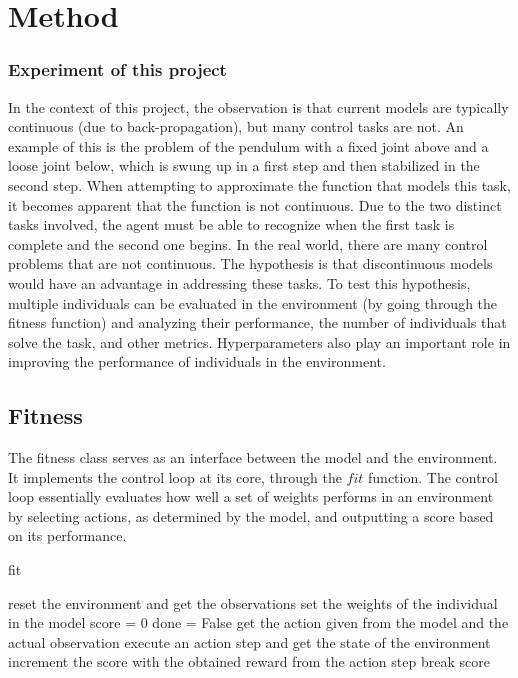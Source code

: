 \chapter{Method}
\label{ch:method}

\subsection{Experiment of this project}
In the context of this project, the observation is that current models are typically continuous (due to back-propagation), but many control tasks are not. An example of this is the problem of the pendulum with a fixed joint above and a loose joint below, which is swung up in a first step and then stabilized in the second step. When attempting to approximate the function that models this task, it becomes apparent that the function is not continuous. Due to the two distinct tasks involved, the agent must be able to recognize when the first task is complete and the second one begins. In the real world, there are many control problems that are not continuous.
The hypothesis is that discontinuous models would have an advantage in addressing these tasks. To test this hypothesis, multiple individuals can be evaluated in the environment (by going through the fitness function) and analyzing their performance, the number of individuals that solve the task, and other metrics. Hyperparameters also play an important role in improving the performance of individuals in the environment.

\section{Fitness}

The fitness class serves as an interface between the model and the environment. It implements the control loop at its core, through the $fit$ function.
The control loop essentially evaluates how well a set of weights performs in an environment by selecting actions, as determined by the model, and outputting a score based on its performance.

\begin{algorithm}
\caption{fit}
\label{pseudo_fit_function}
\begin{algorithmic}[1]
\State reset the environment and get the observations
\State set the weights of the individual in the model
\State score = 0
\State done = False
    \State get the action given from the model and the actual observation
    \State execute an action step and get the state of the environment
    \State increment the score with the obtained reward from the action step
    	\State break
    \EndIf
\EndFor
\Return score
\end{algorithmic}
\end{algorithm}



